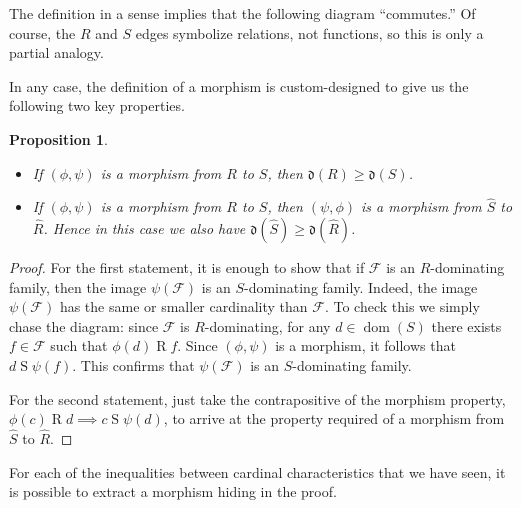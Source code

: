 \documentclass[11pt,oneside]{amsbook}
\DeclareMathOperator{\cod}{cod}
\DeclareMathOperator{\dom}{dom}
\theoremstyle{definition}
\theoremstyle{plain}
\newtheorem{prop}[thm]{Proposition}
\theoremstyle{definition}
\theoremstyle{remark}
\begin{document}
The definition in a sense implies that the following diagram ``commutes.'' Of course, the $R$ and $S$ edges symbolize relations, not functions, so this is only a partial analogy.
\begin{center}
\end{center}
In any case, the definition of a morphism is custom-designed to give us the following two key properties.

\begin{prop}
  \label{prop:morphism}
  \begin{itemize}
  \item If $(\phi,\psi)$ is a morphism from $R$ to $S$, then $\mathfrak d(R)\geq\mathfrak d(S)$.
  \item If $(\phi,\psi)$ is a morphism from $R$ to $S$, then $(\psi,\phi)$ is a morphism from $\hat S$ to $\hat R$. Hence in this case we also have $\mathfrak d(\hat S)\geq\mathfrak d(\hat R)$.
  \end{itemize}
\end{prop}

\begin{proof}
  For the first statement, it is enough to show that if $\mathcal F$ is an $R$-dominating family, then the image $\psi(\mathcal F)$ is an $S$-dominating family. Indeed, the image $\psi(\mathcal F)$ has the same or smaller cardinality than $\mathcal F$. To check this we simply chase the diagram: since $\mathcal F$ is $R$-dominating, for any $d\in\dom(S)$ there exists $f\in\mathcal F$ such that $\phi(d)\mathrel{R}f$. Since $(\phi,\psi)$ is a morphism, it follows that $d\mathrel{S}\psi(f)$. This confirms that $\psi(\mathcal F)$ is an $S$-dominating family.

  For the second statement, just take the contrapositive of the morphism property, $\phi(c)\mathrel R d\implies c\mathrel S\psi(d)$, to arrive at the property required of a morphism from $\hat S$ to $\hat R$.
\end{proof}

For each of the inequalities between cardinal characteristics that we have seen, it is possible to extract a morphism hiding in the proof. 
\end{document}
